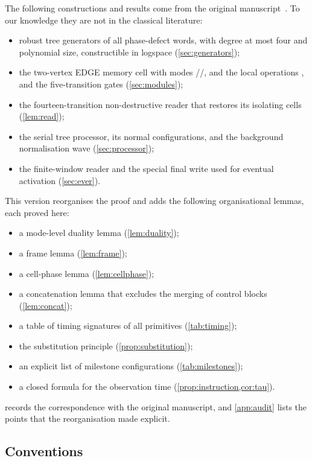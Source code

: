 The following constructions and results come from the original manuscript~\cite{Src}. To our
knowledge they are not in the classical literature:
\begin{itemize}
\item robust tree generators of all phase-defect words, with degree at most four and polynomial
  size, constructible in logspace (\cref{sec:generators});
\item the two-vertex \textsf{EDGE} memory cell with modes \RESET/\HOLD/\LOAD, and the local
  operations ,  and the five-transition gates (\cref{sec:modules});
\item the fourteen-transition non-destructive reader that restores its isolating cells
  (\cref{lem:read});
\item the serial tree processor, its normal configurations, and the background normalisation wave
  (\cref{sec:processor});
\item the finite-window reader and the special final write used for eventual activation
  (\cref{sec:ever}).
\end{itemize}

This version reorganises the proof and adds the following organisational lemmas, each proved here:
\begin{itemize}
\item a mode-level duality lemma (\cref{lem:duality});
\item a frame lemma (\cref{lem:frame});
\item a cell-phase lemma (\cref{lem:cellphase});
\item a concatenation lemma that excludes the merging of control blocks (\cref{lem:concat});
\item a table of timing signatures of all primitives (\cref{tab:timing});
\item the substitution principle (\cref{prop:substitution});
\item an explicit list of milestone configurations (\cref{tab:milestones});
\item a closed formula for the observation time (\cref{prop:instruction,cor:tau}).
\end{itemize}
 records the correspondence with the original manuscript, and \cref{app:audit} lists
the points that the reorganisation made explicit.

\subsection{Conventions}\label{sec:conventions}

